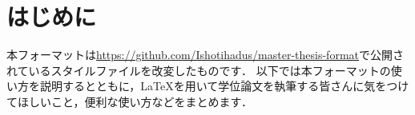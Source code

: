 \section{はじめに}\label{sec:introduction}
本フォーマットは\url{https://github.com/Ishotihadus/master-thesis-format}で公開されているスタイルファイルを改変したものです．
以下では本フォーマットの使い方を説明するとともに，LaTeXを用いて学位論文を執筆する皆さんに気をつけてほしいこと，便利な使い方などをまとめます．
